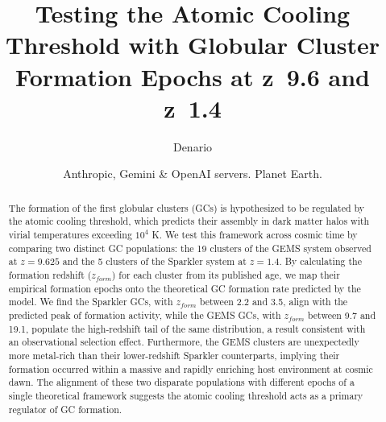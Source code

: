 \documentclass[]{article}
\begin{document}
\title{Testing the Atomic Cooling Threshold with Globular Cluster Formation Epochs at z~9.6 and z~1.4}

\author{Denario}
\date{Anthropic, Gemini \& OpenAI servers. Planet Earth.}

\maketitle
\begin{abstract}
The formation of the first globular clusters (GCs) is hypothesized to be regulated by the atomic cooling threshold, which predicts their assembly in dark matter halos with virial temperatures exceeding $10^4$ K. We test this framework across cosmic time by comparing two distinct GC populations: the 19 clusters of the GEMS system observed at $z=9.625$ and the 5 clusters of the Sparkler system at $z=1.4$. By calculating the formation redshift ($z_{form}$) for each cluster from its published age, we map their empirical formation epochs onto the theoretical GC formation rate predicted by the model. We find the Sparkler GCs, with $z_{form}$ between 2.2 and 3.5, align with the predicted peak of formation activity, while the GEMS GCs, with $z_{form}$ between 9.7 and 19.1, populate the high-redshift tail of the same distribution, a result consistent with an observational selection effect. Furthermore, the GEMS clusters are unexpectedly more metal-rich than their lower-redshift Sparkler counterparts, implying their formation occurred within a massive and rapidly enriching host environment at cosmic dawn. The alignment of these two disparate populations with different epochs of a single theoretical framework suggests the atomic cooling threshold acts as a primary regulator of GC formation.
\end{abstract}
\end{document}
